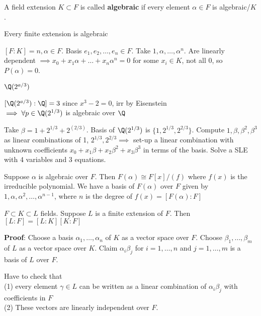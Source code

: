 \documentclass[10pt]{article}
\begin{document}
\begin{defn}
    A field extension $K \subset F$ is called \textbf{algebraic} if every element $\alpha \in F$ is algebraic/$K$.
\end{defn}

\begin{thm}
    Every finite extension is algebraic
\end{thm}

$[F : K] = n, \alpha \in F$. Basis $e_1, e_2, \ldots, e_n \in F$. Take $1, \alpha, \ldots, \alpha^n$. Are linearly dependent $\implies x_0 + x_1\alpha + \ldots + x_n\alpha^n = 0$ for some $x_i \in K$, not all 0, so $P(\alpha) = 0$.

\begin{exm*}
    $\Q(2^{a/3})$
\end{exm*}
$[\Q(2^{a/3}) : \Q] = 3$ since $x^3 - 2 = 0$, irr by Eisenstein\\
$\implies \forall p \in \Q(2^{1/3})$ is algebraic over $\Q$

Take $\beta = 1 + 2^{1/3} + 2^(2/3)$. Basis of $\Q(2^{1/3})$ is $\{1, 2^{1/3}, 2^{2/3}\}$. Compute $1, \beta, \beta^2, \beta^3$ as linear combinations of 1, $2^{1/3}, 2^{2/3} \implies$ set-up a linear combination with unknown coefficients $x_0 + x_1\beta + x_2\beta^2 + x_3\beta^3$ in terms of the basis. Solve a SLE with 4 variables and 3 equations.

\begin{rmk}
    Suppose $\alpha$ is algebraic over $F$. Then $F(\alpha) \cong F[x]/(f)$ where $f(x)$ is the irreducible polynomial.
    We have a basis of $F(\alpha)$ over $F$ given by $1, \alpha, \alpha^2, \ldots, \alpha^{n-1}$, where $n$ is the degree of $f(x) = [F(\alpha) : F]$
\end{rmk}

\begin{thm}
    $F \subset K \subset L$ fields. Suppose $L$ is a finite extension of $F$. Then $[L : F] = [L : K][K : F]$
\end{thm}
\textbf{Proof}: Choose a basis $\alpha_1, \ldots, \alpha_n$ of $K$ as a vector space over $F$. Choose $\beta_1, \ldots, \beta_m$ of $L$ as a vector space over $K$. Claim $\alpha_i\beta_j$ for $i = 1, \ldots, n$ and $j = 1, \ldots, m$ is a basis of $L$ over $F$.

Have to check that \\
(1) every element $\gamma \in L$ can be written as a linear combination of $\alpha_i\beta_j$ with coefficients in $F$\\
(2) These vectors are linearly independent over $F$.
\end{document}
